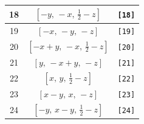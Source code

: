 \documentclass[fleqn,8pt]{jsarticle}
\begin{document}
\begin{longtable}{ccc}
18 & $\left[ - y,\, - x,\, \frac{1}{2} - z \right]$ & {\tt [18]} \\ \hline
19 & $\left[ - x,\, - y,\, - z \right]$ & {\tt [19]} \\ \hline
20 & $\left[ - x + y,\, - x,\, \frac{1}{2} - z \right]$ & {\tt [20]} \\ \hline
21 & $\left[ y,\, - x + y,\, - z \right]$ & {\tt [21]} \\ \hline
22 & $\left[ x,\, y,\, \frac{1}{2} - z \right]$ & {\tt [22]} \\ \hline
23 & $\left[ x - y,\, x,\, - z \right]$ & {\tt [23]} \\ \hline
24 & $\left[ - y,\, x - y,\, \frac{1}{2} - z \right]$ & {\tt [24]} \\
\end{longtable}
\end{document}
